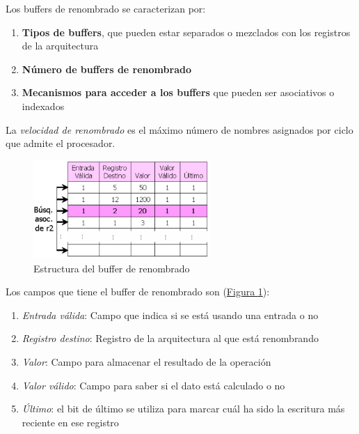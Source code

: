 \documentclass[10pt,a4paper,spanish]{report}
\begin{document}
Los buffers de renombrado se caracterizan por:
\begin{enumerate}[\color{azul}{$\heartsuit$}]
    \item \textbf{\textcolor{azul}{Tipos de buffers}}, que pueden estar separados o mezclados con los registros de la arquitectura
    \item \textbf{\textcolor{azul}{Número de buffers de renombrado}}
    \item \textbf{\textcolor{azul}{Mecanismos para acceder a los buffers}} que pueden ser asociativos o indexados
\end{enumerate}

La \textit{\textcolor{azul}{velocidad de renombrado}} es el máximo número de nombres asignados por ciclo que admite el procesador.

\begin{figure}[!h]
\centering
\includegraphics[width=0.6\textwidth]{96}
\caption{Estructura del buffer de renombrado}
\label{buffer_renom}
\end{figure}

Los campos que tiene el buffer de renombrado son (\hyperref[buffer_renom]{Figura \ref*{buffer_renom}}):
\begin{enumerate}[\color{azul}{$\heartsuit$}]
    \item \textit{\textcolor{azul}{Entrada válida}}: Campo que indica si se está usando una entrada o no
    \item \textit{\textcolor{azul}{Registro destino}}: Registro de la arquitectura al que está renombrando
    \item \textit{\textcolor{azul}{Valor}}: Campo para almacenar el resultado de la operación
    \item \textit{\textcolor{azul}{Valor válido}}: Campo para saber si el dato está calculado o no
    \item \textit{\textcolor{azul}{Último}}: el bit de último se utiliza para marcar cuál ha sido la escritura más reciente en ese registro
\end{enumerate}
\end{document}
